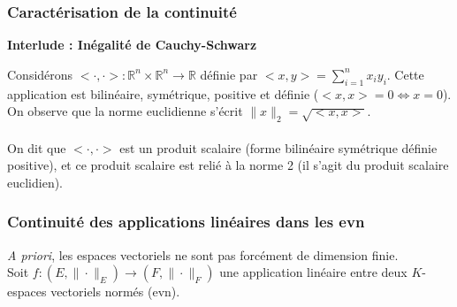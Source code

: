 \documentclass{article}
\begin{document}
\subsubsection{Caractérisation de la continuité}


\noindent\textbf{Interlude : Inégalité de Cauchy-Schwarz}

Considérons $<\cdot , \cdot > \colon \mathbb{R}^n \times \mathbb{R}^n \to \mathbb{R}$ définie par $<x,y> = \sum_{i=1}^{n} x_i y_i$.
Cette application est bilinéaire, symétrique, positive et définie ($<x,x> = 0 \Leftrightarrow x = 0$).\\
On observe que la norme euclidienne s'écrit $\|x\|_2 = \sqrt{<x,x>}$.\\\\

On dit que $<\cdot , \cdot >$ est un produit scalaire (forme bilinéaire symétrique définie positive), et ce produit scalaire est relié à la norme 2 (il s'agit du produit scalaire euclidien).



\subsubsection{Continuité des applications linéaires dans les evn}

\textit{A priori}, les espaces vectoriels ne sont pas forcément de dimension finie.\\
Soit $f \colon (E, \|\cdot\|_E) \to (F, \|\cdot\|_F)$ une application linéaire entre deux $K$-espaces vectoriels normés (evn).\\
\end{document}
